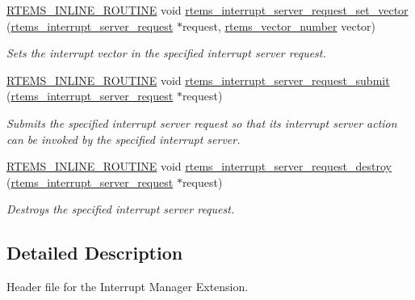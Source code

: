 \begin{DoxyCompactItemize}
\mbox{\hyperlink{group__RTEMSScoreBaseDefs_gac216239df231d5dbd15e3520b0b9313f}{R\+T\+E\+M\+S\+\_\+\+I\+N\+L\+I\+N\+E\+\_\+\+R\+O\+U\+T\+I\+NE}} void \mbox{\hyperlink{group__rtems__interrupt__extension_gabdace0e27d0d7771f58d8471284e512d}{rtems\+\_\+interrupt\+\_\+server\+\_\+request\+\_\+set\+\_\+vector}} (\mbox{\hyperlink{structrtems__interrupt__server__request}{rtems\+\_\+interrupt\+\_\+server\+\_\+request}} $\ast$request, \mbox{\hyperlink{group__ClassicINTR_ga3e434c197d99f128e78cae4d9358bd8b}{rtems\+\_\+vector\+\_\+number}} vector)
\begin{DoxyCompactList}\small\item\em Sets the interrupt vector in the specified interrupt server request. \end{DoxyCompactList}\item 
\mbox{\hyperlink{group__RTEMSScoreBaseDefs_gac216239df231d5dbd15e3520b0b9313f}{R\+T\+E\+M\+S\+\_\+\+I\+N\+L\+I\+N\+E\+\_\+\+R\+O\+U\+T\+I\+NE}} void \mbox{\hyperlink{group__rtems__interrupt__extension_ga8559c103b6e77d0fca7626ee20ee4efa}{rtems\+\_\+interrupt\+\_\+server\+\_\+request\+\_\+submit}} (\mbox{\hyperlink{structrtems__interrupt__server__request}{rtems\+\_\+interrupt\+\_\+server\+\_\+request}} $\ast$request)
\begin{DoxyCompactList}\small\item\em Submits the specified interrupt server request so that its interrupt server action can be invoked by the specified interrupt server. \end{DoxyCompactList}\item 
\mbox{\hyperlink{group__RTEMSScoreBaseDefs_gac216239df231d5dbd15e3520b0b9313f}{R\+T\+E\+M\+S\+\_\+\+I\+N\+L\+I\+N\+E\+\_\+\+R\+O\+U\+T\+I\+NE}} void \mbox{\hyperlink{group__rtems__interrupt__extension_ga214d16550a77f48cfb461afd9e7d2006}{rtems\+\_\+interrupt\+\_\+server\+\_\+request\+\_\+destroy}} (\mbox{\hyperlink{structrtems__interrupt__server__request}{rtems\+\_\+interrupt\+\_\+server\+\_\+request}} $\ast$request)
\begin{DoxyCompactList}\small\item\em Destroys the specified interrupt server request. \end{DoxyCompactList}\end{DoxyCompactItemize}


\subsection{Detailed Description}
Header file for the Interrupt Manager Extension. 

